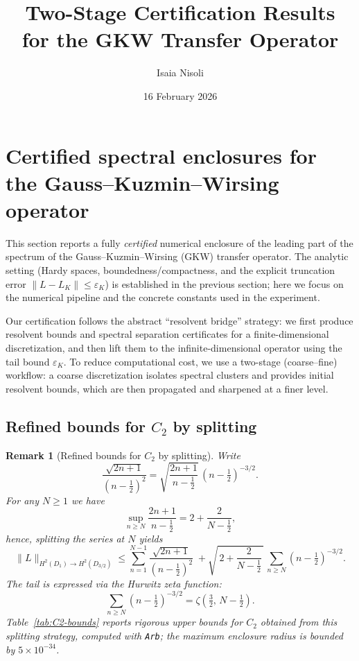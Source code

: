 \documentclass[11pt]{article}
\title{Two-Stage Certification Results\\for the GKW Transfer Operator}
\author{Isaia Nisoli}
\date{16 February 2026}
\newtheorem{remark}{Remark}
\begin{document}
\maketitle



\section{Certified spectral enclosures for the Gauss--Kuzmin--Wirsing operator}
\label{sec:gkw-certified-enclosures}

This section reports a fully \emph{certified} numerical enclosure of the leading part of the spectrum of the
Gauss--Kuzmin--Wirsing (GKW) transfer operator.
The analytic setting (Hardy spaces, boundedness/compactness, and the explicit truncation error
\(\|L-L_K\|\le \varepsilon_K\)) is established in the previous section; here we focus on the numerical pipeline
and the concrete constants used in the experiment.

Our certification follows the abstract ``resolvent bridge'' strategy: we first produce resolvent bounds and
spectral separation certificates for a finite-dimensional discretization, and then lift them to the
infinite-dimensional operator using the tail bound \(\varepsilon_K\).
To reduce computational cost, we use a two-stage (coarse--fine) workflow: a coarse discretization isolates
spectral clusters and provides initial resolvent bounds, which are then propagated and sharpened at a finer
level.

\subsection{Refined bounds for $C_2$ by splitting}
\label{subsec:C2-splitting}

\begin{remark}[Refined bounds for $C_2$ by splitting]\label{rem:C2-splitting}
Write
\[
\frac{\sqrt{2n+1}}{(n-\tfrac12)^2}
=\sqrt{\frac{2n+1}{\,n-\tfrac12\,}}\,(n-\tfrac12)^{-3/2}.
\]
For any $N\ge 1$ we have
\[
\sup_{n\ge N}\frac{2n+1}{n-\tfrac12}
=2+\frac{2}{N-\tfrac12},
\]
hence, splitting the series at $N$ yields
\[
\|L\|_{H^2(D_1)\to H^2(D_{3/2})}
\le
\sum_{n=1}^{N-1}\frac{\sqrt{2n+1}}{(n-\tfrac12)^2}
\;+
\sqrt{\,2+\frac{2}{N-\tfrac12}\,}\,
\sum_{n\ge N}(n-\tfrac12)^{-3/2}.
\]
The tail is expressed via the Hurwitz zeta function:
\[
\sum_{n\ge N}(n-\tfrac12)^{-3/2}
=\zeta\!\left(\tfrac32,\,N-\tfrac12\right).
\]
Table~\ref{tab:C2-bounds} reports rigorous upper bounds for $C_2$ obtained from this splitting strategy,
computed with \texttt{Arb}; the maximum enclosure radius is bounded by $5\times 10^{-34}$.
\end{remark}
\end{document}
